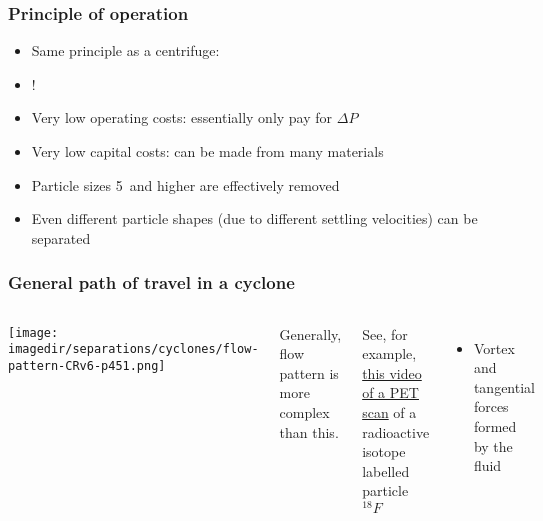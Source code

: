 \begin{frame}\frametitle{Principle of operation}
	\begin{itemize}
		\item	Same principle as a centrifuge: \textbf{{\color{myGreen}{density difference required}}}
		\item	{\color{myOrange}{No moving parts}}!
		\item	Very low operating costs: essentially only pay for $\Delta P$
		\item	Very low capital costs: can be made from many materials
		\item	Particle sizes 5\micron\,  and higher are effectively removed
		\item	Even different particle shapes (due to different settling velocities) can be separated
	\end{itemize}	
\end{frame}

\begin{frame}\frametitle{General path of travel in a cyclone {}}
	\begin{columns}[c]
			\begin{center}
				\texttt{[image: \\imagedir/separations/cyclones/flow-pattern-CRv6-p451.png]}
			\end{center}
			Generally, flow pattern is more complex than this. 
			
			\vspace{12pt}			
			See, for example, \href{http://www.youtube.com/watch?v=CWLARs\_dJO0}{this video of a PET scan} of a radioactive isotope labelled particle $^{18}F$
			
			\vspace{12pt}
			\begin{itemize}
				\item	Vortex and tangential forces formed by the fluid
			\end{itemize}
	\end{columns}
\end{frame}

